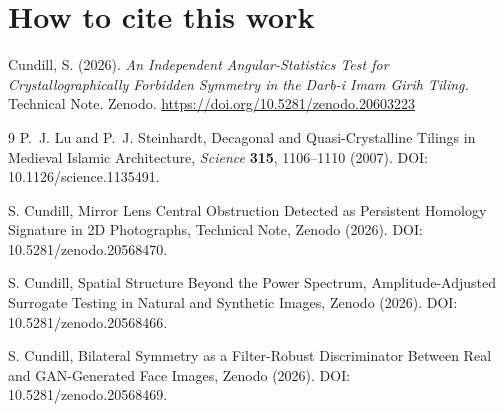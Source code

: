 \documentclass[11pt]{article}
\begin{document}
\section*{How to cite this work}

Cundill, S. (2026). \textit{An Independent Angular-Statistics Test for
Crystallographically Forbidden Symmetry in the Darb-i Imam Girih Tiling.}
Technical Note. Zenodo.
\href{https://doi.org/10.5281/zenodo.20603223}{https://doi.org/10.5281/zenodo.20603223}

\begin{thebibliography}{9}
\small
{} P.~J. Lu and P.~J. Steinhardt, Decagonal and Quasi-Crystalline
Tilings in Medieval Islamic Architecture, \textit{Science} \textbf{315},
1106--1110 (2007). DOI: 10.1126/science.1135491.

 S. Cundill, Mirror Lens Central Obstruction Detected as
Persistent Homology Signature in 2D Photographs, Technical Note, Zenodo (2026).
DOI: 10.5281/zenodo.20568470.

 S. Cundill, Spatial Structure Beyond the Power Spectrum,
Amplitude-Adjusted Surrogate Testing in Natural and Synthetic Images, Zenodo
(2026). DOI: 10.5281/zenodo.20568466.

 S. Cundill, Bilateral Symmetry as a Filter-Robust
Discriminator Between Real and GAN-Generated Face Images, Zenodo (2026). DOI:
10.5281/zenodo.20568469.
\end{thebibliography}
\end{document}
